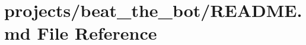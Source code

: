 \hypertarget{projects_2beat__the__bot_2README_8md}{}\section{projects/beat\+\_\+the\+\_\+bot/\+R\+E\+A\+D\+ME.md File Reference}
\label{projects_2beat__the__bot_2README_8md}

